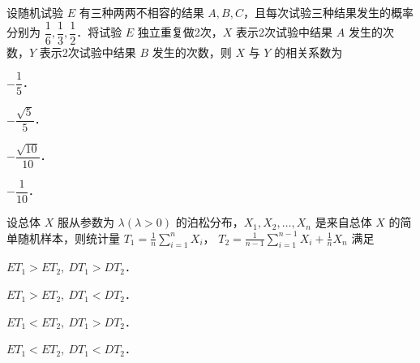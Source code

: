 \begin{question}[index=9]
设随机试验 $E$ 有三种两两不相容的结果 $A,B,C$，且每次试验三种结果发生的概率分别为 $\dfrac16,\dfrac13,\dfrac12$．将试验 $E$ 独立重复做2次，$X$ 表示2次试验中结果 $A$ 发生的次数，$Y$ 表示2次试验中结果 $B$ 发生的次数，则 $X$ 与 $Y$ 的相关系数为
\begin{choices}[columns=4,label-pos=left]
\item $-\dfrac15$．
\item $-\dfrac{\sqrt5}{5}$．
\item $-\dfrac{\sqrt{10}}{10}$．
\item $-\dfrac{1}{10}$．
\end{choices}
\end{question}
\QuestionBreak

\begin{question}[index=10]
设总体 $X$ 服从参数为 $\lambda(\lambda>0)$ 的泊松分布，$X_1,X_2,\ldots,X_n$ 是来自总体 $X$ 的简单随机样本，则统计量
$\displaystyle T_1=\frac1n\sum_{i=1}^{n}X_i$，
$\displaystyle T_2=\frac1{n-1}\sum_{i=1}^{n-1}X_i+\frac1n X_n$ 满足
\begin{choices}[columns=2]
\item $ET_1>ET_2,\ DT_1>DT_2$．
\item $ET_1>ET_2,\ DT_1<DT_2$．
\item $ET_1<ET_2,\ DT_1>DT_2$．
\item $ET_1<ET_2,\ DT_1<DT_2$．
\end{choices}
\end{question}

